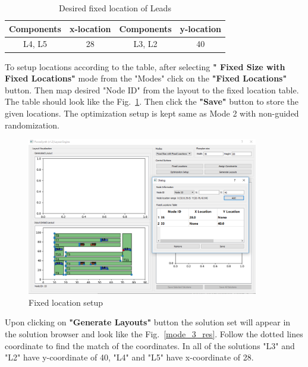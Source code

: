 \documentclass[11pt]{article}
\begin{document}
\begin{itemize}
    \begin{table}[H]
    \centering
    \caption{Desired fixed location of Leads}
    \label{tab:my-table}
    \begin{tabular}{|c|c|c|c|}
    \hline
    \textbf{Components} & \textbf{x-location} & \textbf{Components} & \textbf{y-location} \\ \hline
    L4, L5 & 28 & L3, L2 & 40 \\ \hline
    \end{tabular}
    \end{table}
    
    To setup locations according to the table, after selecting \textbf{" Fixed Size with Fixed Locations"} mode from the "Modes" click on the \textbf{"Fixed Locations"} button. Then map desired "Node ID" from the layout to the fixed location table. The table should look like the Fig.~\ref{fix_loc_set}. Then click the \textbf{"Save"} button to store the given locations. The optimization setup is kept same as Mode 2 with non-guided randomization.
    \begin{figure}[H]
    \centering
    \includegraphics[width=0.9\textwidth]{./figs/Test/mode_3_fix.PNG}
    \caption{Fixed location setup}
    \label{fix_loc_set}
    \end{figure}
     Upon clicking on \textbf{"Generate Layouts"} button the solution set will appear in the solution browser and look like the Fig.~\ref{mode_3_res}. Follow the dotted lines coordinate to find the match of the coordinates. In all of the solutions "L3" and "L2" have y-coordinate of 40, "L4" and "L5" have x-coordinate of 28.
     

\end{itemize}
\end{document}
